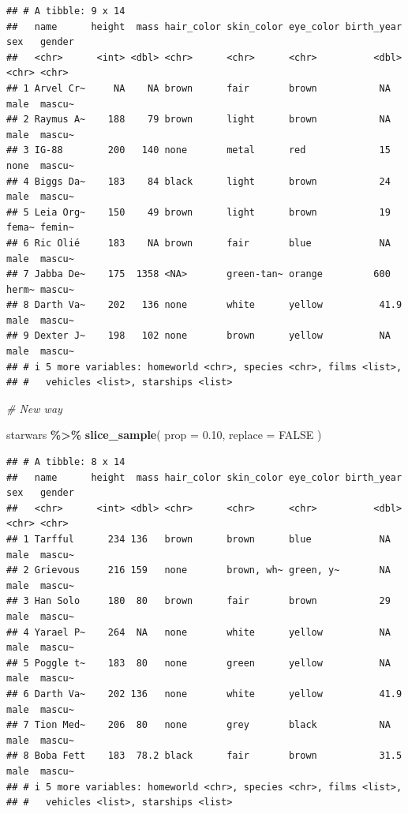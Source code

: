 \documentclass[
]{book}
\newenvironment{Shaded}{\begin{snugshade}}{\end{snugshade}}
\newcommand{\AttributeTok}[1]{\textcolor[rgb]{0.13,0.29,0.53}{#1}}
\newcommand{\CommentTok}[1]{\textcolor[rgb]{0.56,0.35,0.01}{\textit{#1}}}
\newcommand{\ConstantTok}[1]{\textcolor[rgb]{0.56,0.35,0.01}{#1}}
\newcommand{\FloatTok}[1]{\textcolor[rgb]{0.00,0.00,0.81}{#1}}
\newcommand{\FunctionTok}[1]{\textcolor[rgb]{0.13,0.29,0.53}{\textbf{#1}}}
\newcommand{\NormalTok}[1]{#1}
\newcommand{\SpecialCharTok}[1]{\textcolor[rgb]{0.81,0.36,0.00}{\textbf{#1}}}
\begin{document}
\begin{verbatim}
## # A tibble: 9 x 14
##   name      height  mass hair_color skin_color eye_color birth_year sex   gender
##   <chr>      <int> <dbl> <chr>      <chr>      <chr>          <dbl> <chr> <chr> 
## 1 Arvel Cr~     NA    NA brown      fair       brown           NA   male  mascu~
## 2 Raymus A~    188    79 brown      light      brown           NA   male  mascu~
## 3 IG-88        200   140 none       metal      red             15   none  mascu~
## 4 Biggs Da~    183    84 black      light      brown           24   male  mascu~
## 5 Leia Org~    150    49 brown      light      brown           19   fema~ femin~
## 6 Ric Olié     183    NA brown      fair       blue            NA   male  mascu~
## 7 Jabba De~    175  1358 <NA>       green-tan~ orange         600   herm~ mascu~
## 8 Darth Va~    202   136 none       white      yellow          41.9 male  mascu~
## 9 Dexter J~    198   102 none       brown      yellow          NA   male  mascu~
## # i 5 more variables: homeworld <chr>, species <chr>, films <list>,
## #   vehicles <list>, starships <list>
\end{verbatim}

\begin{Shaded}
\begin{Highlighting}[]
\CommentTok{\# New way}

\NormalTok{starwars }\SpecialCharTok{\%\textgreater{}\%}
  \FunctionTok{slice\_sample}\NormalTok{(}
    \AttributeTok{prop =} \FloatTok{0.10}\NormalTok{,}
    \AttributeTok{replace =} \ConstantTok{FALSE}
\NormalTok{  )}
\end{Highlighting}
\end{Shaded}

\begin{verbatim}
## # A tibble: 8 x 14
##   name      height  mass hair_color skin_color eye_color birth_year sex   gender
##   <chr>      <int> <dbl> <chr>      <chr>      <chr>          <dbl> <chr> <chr> 
## 1 Tarfful      234 136   brown      brown      blue            NA   male  mascu~
## 2 Grievous     216 159   none       brown, wh~ green, y~       NA   male  mascu~
## 3 Han Solo     180  80   brown      fair       brown           29   male  mascu~
## 4 Yarael P~    264  NA   none       white      yellow          NA   male  mascu~
## 5 Poggle t~    183  80   none       green      yellow          NA   male  mascu~
## 6 Darth Va~    202 136   none       white      yellow          41.9 male  mascu~
## 7 Tion Med~    206  80   none       grey       black           NA   male  mascu~
## 8 Boba Fett    183  78.2 black      fair       brown           31.5 male  mascu~
## # i 5 more variables: homeworld <chr>, species <chr>, films <list>,
## #   vehicles <list>, starships <list>
\end{verbatim}
\end{document}
